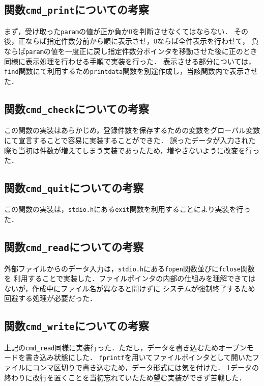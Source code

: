 \documentclass[a4j,11pt]{jarticle}
\begin{document}
\subsection{関数\texttt{cmd\_print}についての考察}
まず，受け取った\verb|param|の値が正か負か$0$を判断させなくてはならない．
その後，正ならば指定件数分前から順に表示させ，$0$ならば全件表示を行わせて，
負ならば\verb|param|の値を一度正に戻し指定件数分ポインタを移動させた後に正のとき同様に表示処理を行わせる手順で実装を行った．
表示させる部分については，\verb|find|関数にて利用するため\verb|printdata|関数を別途作成し，当該関数内で表示させた．
\subsection{関数\texttt{cmd\_check}についての考察}
この関数の実装はあらかじめ，登録件数を保存するための変数をグローバル変数にて宣言することで容易に実装することができた．
誤ったデータが入力された際も当初は件数が増えてしまう実装であったため，増やさないように改変を行った．

\subsection{関数\texttt{cmd\_quit}についての考察}
この関数の実装は，\verb|stdio.h|にある\verb|exit|関数を利用することにより実装を行った．

\subsection{関数\texttt{cmd\_read}についての考察}
外部ファイルからのデータ入力は，\verb|stdio.h|にある\verb|fopen|関数並びに\verb|fclose|関数を
利用することで実装した．ファイルポインタの内部の仕組みを理解できてはないが，作成中にファイル名が異なると開けずに
システムが強制終了するため回避する処理が必要だった．

\subsection{関数\texttt{cmd\_write}についての考察}
上記の\verb|cmd_read|同様に実装行った．ただし，データを書き込むためオープンモードを書き込み状態にした．
\verb|fprintf|を用いてファイルポインタとして開いたファイルにコンマ区切りで書き込むため，データ形式には気を付けた．
1データの終わりに改行を置くことを当初忘れていたため望む実装ができず苦戦した．
\end{document}
